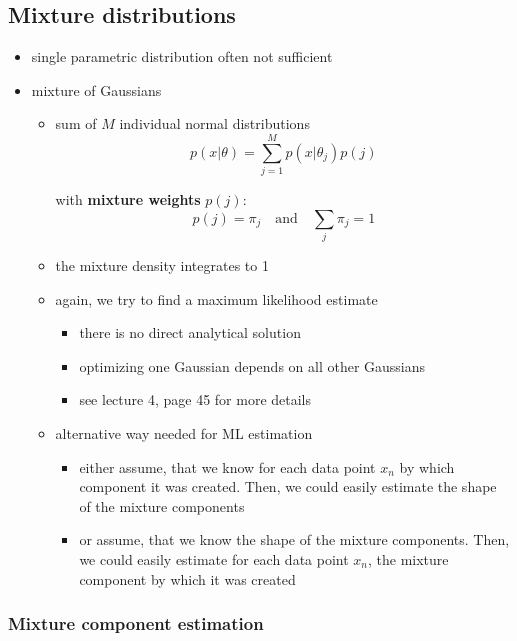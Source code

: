 \documentclass{article}
\renewcommand{\emph}[1]{\textbf{#1}}
\begin{document}
\subsection{Mixture distributions}

\begin{itemize}
  \item single parametric distribution often not sufficient
  \item mixture of Gaussians
  \begin{itemize}
    \item sum of $M$ individual normal distributions
    \[
      p(x|\theta) = \sum_{j=1}^M p(x|\theta_j)p(j)
    \]

    with \emph{mixture weights} $p(j)$:
    \[
      p(j) = \pi_j \quad \text{and} \quad \sum_j \pi_j = 1
    \]
    \item the mixture density integrates to 1
    \item again, we try to find a maximum likelihood estimate
    \begin{itemize}
      \item there is no direct analytical solution
      \item optimizing one Gaussian depends on all other Gaussians
      \item see lecture 4, page 45 for more details
    \end{itemize}
    \item alternative way needed for ML estimation
    \begin{itemize}
      \item either assume, that we know for each data point $x_n$ by which component it was created. Then, we could easily estimate the shape of the mixture components
      \item or assume, that we know the shape of the mixture components. Then, we could easily estimate for each data point $x_n$, the mixture component by which it was created
    \end{itemize}
  \end{itemize}
\end{itemize}

\subsubsection{Mixture component estimation}
\end{document}
